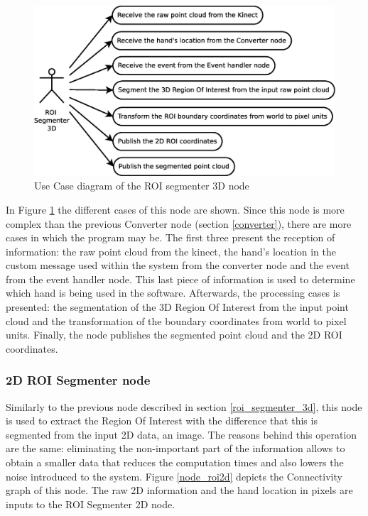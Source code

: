 	\begin{figure}[H]
		\centering
	\includegraphics[scale=0.4]{img/diagrams/uc_roi_segmenter_3d.eps}
		\caption[Use case diagram ROI segmenter 3D node]{Use Case diagram of the ROI segmenter 3D node}
		\label{uc_roi3d}	
	\end{figure}
 
	In Figure \ref{uc_roi3d} the different cases of this node are shown. 
	Since this node is more complex than the previous Converter node (section \ref{converter}), there are more cases in which the program may be. 
	The first three present the reception of information: the raw point cloud from the kinect, the hand's location in the custom message used within the system from the converter node and the event from the event handler node. 
	This last piece of information is used to determine which hand is being used in the software. 
	Afterwards, the processing cases is presented: the segmentation of the 3D Region Of Interest from the input point cloud and the transformation of the boundary coordinates from world to pixel units. 
	Finally, the node publishes the segmented point cloud and the 2D ROI coordinates. 

\subsubsection{2D ROI Segmenter node}
	\label{roi_segmenter_2d}
	
	Similarly to the previous node described in section \ref{roi_segmenter_3d}, this node is used to extract the Region Of Interest with the difference that this is segmented from the input 2D data, an image. 
	The reasons behind this operation are the same: eliminating the non-important part of the information allows to obtain a smaller data that reduces the computation times and also lowers the noise introduced to the system. 
	Figure \ref{node_roi2d} depicts the Connectivity graph of this node. 
	The raw 2D information and the hand location in pixels are inputs to the ROI Segmenter 2D node. 

